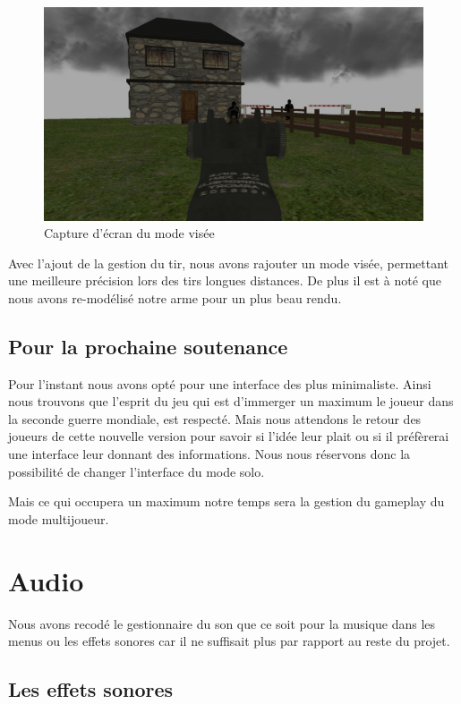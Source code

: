 \documentclass[11pt]{report}
\begin{document}
\begin{figure}[htbp]
\centering
\includegraphics[scale=0.13]{mode-visee.png}
\caption{Capture d'écran du mode visée}
\end{figure}

Avec l'ajout de la gestion du tir, nous avons rajouter un mode visée, permettant une meilleure précision lors des tirs longues distances. De plus il est à noté que nous avons re-modélisé notre arme pour un plus beau rendu.

\subsection{Pour la prochaine soutenance}

Pour l'instant nous avons opté pour une interface des plus minimaliste. Ainsi nous trouvons que l'esprit du jeu qui est d'immerger un maximum le joueur dans la seconde guerre mondiale, est respecté. Mais nous attendons le retour des joueurs de cette nouvelle version pour savoir si l'idée leur plait ou si il préfèrerai une interface leur donnant des informations. Nous nous réservons donc la possibilité de changer l'interface du mode solo.

Mais ce qui occupera un maximum notre temps sera la gestion du gameplay du mode multijoueur.

\newpage
\section{Audio}

Nous avons recodé le gestionnaire du son que ce soit pour la musique dans les menus ou les effets sonores car il ne suffisait plus par rapport au reste du projet.

\subsection{Les effets sonores}
\end{document}
